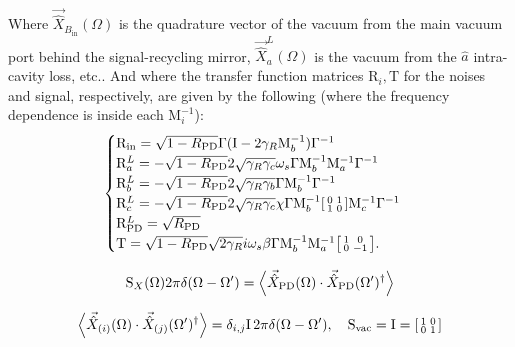 Where $\vec{\hat{X}}_{B_\mathrm{in}}(\Omega)$ is the quadrature vector of the vacuum from the main vacuum port behind the signal-recycling mirror, $\vec{\hat{X}}^L_a(\Omega)$ is the vacuum from the $\hat{a}$ intra-cavity loss, etc.. And where the transfer function matrices $\mathrm{R}_i, \mathrm{T}$ for the noises and signal, respectively, are given by the following (where the frequency dependence is inside each $\mathrm{M}_i^{-1}$):
\begin{equation}
\begin{cases}
\mathrm{R_{in}}=\sqrt{1-R_\mathrm{PD}} \Gamma(\mathrm{I}-2\gamma_R\mathrm{M}_b^{-1})\Gamma^{-1}\\
\mathrm{R}^L_a=-\sqrt{1-R_\mathrm{PD}} 2\sqrt{\gamma_R\gamma_c}\omega_s\Gamma\mathrm{M}_b^{-1}\mathrm{M}_a^{-1}\Gamma^{-1}\\
\mathrm{R}^L_b=-\sqrt{1-R_\mathrm{PD}} 2\sqrt{\gamma_R\gamma_b}\Gamma\mathrm{M}_b^{-1}\Gamma^{-1}\\
\mathrm{R}^L_c=-\sqrt{1-R_\mathrm{PD}} 2\sqrt{\gamma_R\gamma_c}\chi\Gamma\mathrm{M}_b^{-1}\begin{bsmallmatrix}
0 & 1 \\ 
1 & 0
\end{bsmallmatrix}\mathrm{M}_c^{-1}\Gamma^{-1}\\
\mathrm{R}^L_\mathrm{PD}=\sqrt{R_\mathrm{PD}}\\
\mathrm{T}=\sqrt{1-R_\mathrm{PD}} \sqrt{2\gamma_R}i\omega_s\beta \Gamma\mathrm{M}_b^{-1}\mathrm{M}_a^{-1}\begin{bsmallmatrix}
1 & 0 \\ 
0 & -1
\end{bsmallmatrix}.
\end{cases}
\end{equation} 



\begin{equation}
\mathrm{S}_X(\Omega)2\pi\delta(\Omega-\Omega')=\ev{\vec{\hat{X}}_\mathrm{PD}(\Omega)\cdot\vec{\hat{X}}_\mathrm{PD}(\Omega')^\dag}
\end{equation}


\begin{equation}
\ev{\vec{\hat{X}}_{(i)}(\Omega)\cdot\vec{\hat{X}}_{(j)}(\Omega')^\dag}=\delta_{i,j}\mathrm{I}\,2\pi\delta(\Omega-\Omega'),\quad \mathrm{S_{vac}}=\mathrm{I}=\begin{bsmallmatrix}
1 & 0 \\ 
0 & 1
\end{bsmallmatrix}
\end{equation}

